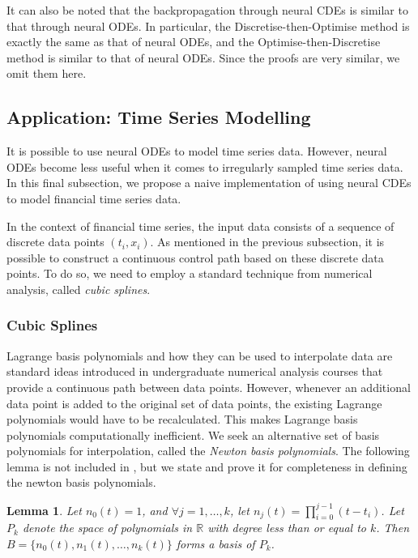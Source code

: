 \documentclass[a4paper,11pt,titlepage]{article}
\theoremstyle{definition}
\theoremstyle{plain}
\newtheorem{lemma}[theorem]{Lemma}
\theoremstyle{remark}
\begin{document}
It can also be noted that the backpropagation through neural CDEs is similar to that through neural ODEs. In particular, the Discretise-then-Optimise method is exactly the same as that of neural ODEs, and the Optimise-then-Discretise method is similar to that of neural ODEs. Since the proofs are very similar, we omit them here.

\subsection{Application: Time Series Modelling}

It is possible to use neural ODEs to model time series data. However, neural ODEs become less useful when it comes to irregularly sampled time series data. In this final subsection, we propose a naive implementation of using neural CDEs to model financial time series data.

In the context of financial time series, the input data consists of a sequence of discrete data points $\left(t_i,x_i\right)$. As mentioned in the previous subsection, it is possible to construct a continuous control path based on these discrete data points. To do so, we need to employ a standard technique from numerical analysis, called \textit{cubic splines}. 

\subsubsection{Cubic Splines}

Lagrange basis polynomials and how they can be used to interpolate data are standard ideas introduced in undergraduate numerical analysis courses that provide a continuous path between data points. However, whenever an additional data point is added to the original set of data points, the existing Lagrange polynomials would have to be recalculated. This makes Lagrange basis polynomials computationally inefficient. We seek an alternative set of basis polynomials for interpolation, called the \textit{Newton basis polynomials}. The following lemma is not included in \cite{Gautschi2012}, but we state and prove it for completeness in defining the newton basis polynomials.

\begin{lemma}
    Let $n_0(t)=1$, and $\forall j=1,\dots,k$, let $n_j(t)=\prod_{i=0}^{j-1}(t-t_i)$. Let $P_k$ denote the space of polynomials in $\mathbb{R}$ with  degree less than or equal to $k$. Then $B=\{n_0(t),n_1(t),\dots,n_k(t)\}$ forms a basis of $P_k$.
\end{lemma}
\end{document}
